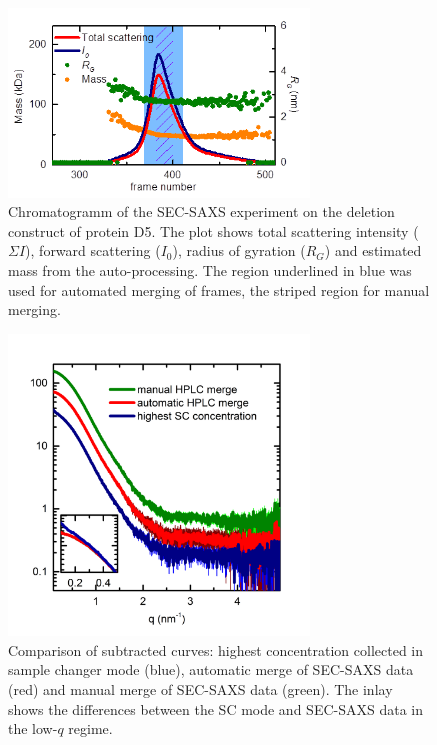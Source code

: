 \documentclass[preprint,pdf]{iucr}              %
\begin{document}
\begin{figure}
\centering
\includegraphics[width=8cm]{sec.png}
\caption{Chromatogramm of the SEC-SAXS experiment on the deletion construct of
protein D5.
The plot shows total scattering intensity ($\Sigma I$), forward scattering
($I_0$), radius of gyration ($R_G$) and estimated mass from the
auto-processing.
The region underlined in blue was used for automated merging of frames, the
striped region for manual merging.}
\label{fgr:SEC}
\end{figure}

\begin{figure}
\centering
\includegraphics[width=8cm]{curves.png}
\caption{Comparison of subtracted curves: highest concentration collected in
sample changer mode (blue), automatic merge of SEC-SAXS data (red) and manual
merge of SEC-SAXS data (green). The inlay shows the differences between the SC
mode and SEC-SAXS data in the low-$q$ regime. }
\label{fgr:curves}
\end{figure}
\end{document}
